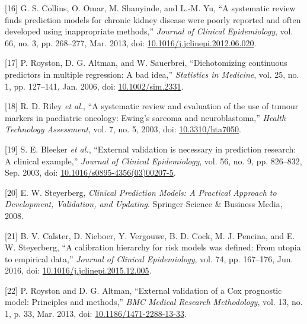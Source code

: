 \documentclass[12pt,PhD,twoside,openright]{muthesis}
\newenvironment{cslreferences}%
  {}%
  {\par}
\begin{document}
\begin{cslreferences}
\leavevmode\hypertarget{ref-collins_systematic_2013}{}%
{[}16{]} G. S. Collins, O. Omar, M. Shanyinde, and L.-M. Yu, ``A systematic review finds prediction models for chronic kidney disease were poorly reported and often developed using inappropriate methods,'' \emph{Journal of Clinical Epidemiology}, vol. 66, no. 3, pp. 268--277, Mar. 2013, doi: \href{https://doi.org/10.1016/j.jclinepi.2012.06.020}{10.1016/j.jclinepi.2012.06.020}.

\leavevmode\hypertarget{ref-royston_dichotomizing_2006}{}%
{[}17{]} P. Royston, D. G. Altman, and W. Sauerbrei, ``Dichotomizing continuous predictors in multiple regression: A bad idea,'' \emph{Statistics in Medicine}, vol. 25, no. 1, pp. 127--141, Jan. 2006, doi: \href{https://doi.org/10.1002/sim.2331}{10.1002/sim.2331}.

\leavevmode\hypertarget{ref-riley_systematic_2003-1}{}%
{[}18{]} R. D. Riley \emph{et al.}, ``A systematic review and evaluation of the use of tumour markers in paediatric oncology: Ewing's sarcoma and neuroblastoma,'' \emph{Health Technology Assessment}, vol. 7, no. 5, 2003, doi: \href{https://doi.org/10.3310/hta7050}{10.3310/hta7050}.

\leavevmode\hypertarget{ref-bleeker_external_2003}{}%
{[}19{]} S. E. Bleeker \emph{et al.}, ``External validation is necessary in prediction research: A clinical example,'' \emph{Journal of Clinical Epidemiology}, vol. 56, no. 9, pp. 826--832, Sep. 2003, doi: \href{https://doi.org/10.1016/s0895-4356(03)00207-5}{10.1016/s0895-4356(03)00207-5}.

\leavevmode\hypertarget{ref-steyerberg_clinical_2008}{}%
{[}20{]} E. W. Steyerberg, \emph{Clinical Prediction Models: A Practical Approach to Development, Validation, and Updating}. Springer Science \& Business Media, 2008.

\leavevmode\hypertarget{ref-calster_calibration_2016-1}{}%
{[}21{]} B. V. Calster, D. Nieboer, Y. Vergouwe, B. D. Cock, M. J. Pencina, and E. W. Steyerberg, ``A calibration hierarchy for risk models was defined: From utopia to empirical data,'' \emph{Journal of Clinical Epidemiology}, vol. 74, pp. 167--176, Jun. 2016, doi: \href{https://doi.org/10.1016/j.jclinepi.2015.12.005}{10.1016/j.jclinepi.2015.12.005}.

\leavevmode\hypertarget{ref-royston_external_2013}{}%
{[}22{]} P. Royston and D. G. Altman, ``External validation of a Cox prognostic model: Principles and methods,'' \emph{BMC Medical Research Methodology}, vol. 13, no. 1, p. 33, Mar. 2013, doi: \href{https://doi.org/10.1186/1471-2288-13-33}{10.1186/1471-2288-13-33}.


\end{cslreferences}
\end{document}
